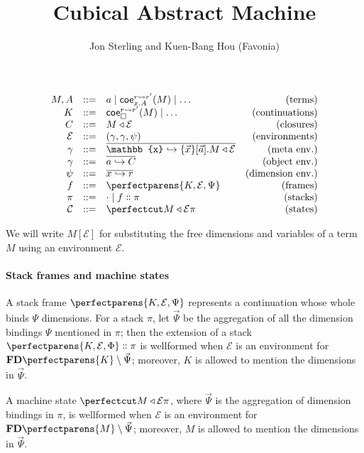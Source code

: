 \documentclass{article}
\title{Cubical Abstract Machine}
\author{Jon Sterling and Kuen-Bang Hou (Favonia)}
\newcommand\Clo[2]{#1\triangleleft{#2}}
\newcommand\Coe[4]{\mathsf{coe}^{#1\leadsto{#2}}_{#3} (#4)}
\newcommand\Cons[2]{{#1}\dblcolon{#2}}
\newcommand\FreeDims[1]{\mathbf{FD}\perfectparens{#1}}
\newcommand\Frame[3]{\perfectparens{#1,#2,#3}}
\newcommand\Cfg[3]{\cut{\Clo{#1}{#2}}{#3}}
\newcommand\Meta[1]{\mathbb{#1}}
\begin{document}
\maketitle

\[
  \begin{array}{rrlr}
    M,A &::= &a\mid \Coe{r}{r'}{x.A}{M}\mid\ldots&\text{(terms)}\\
    K &::= &\Coe{r}{r'}{\Box}{M}\mid\ldots&\text{(continuations)}\\
    C &::= &\Clo{M}{\mathcal{E}}&\text{(closures)}\\
    \mathcal{E} &::= &(\Meta{\gamma},\gamma,\psi)&\text{(environments)}\\
    \Meta{\gamma} &::= &\overline{\Meta{x}\hookrightarrow\{\vec{x}\}[\vec{a}].\Clo{M}{\mathcal{E}}}&\text{(meta env.)}\\
    \gamma &::= &\overline{a\hookrightarrow C}&\text{(object env.)}\\
    \psi &::= &\overline{x\hookrightarrow r}&\text{(dimension env.)}\\
    f &::= &\Frame{K}{\mathcal{E}}{\Psi} &\text{(frames)}\\
    \pi &::= &\cdot \mid \Cons{f}{\pi} &\text{(stacks)}\\
    \mathcal{C} &::= &\Cfg{M}{\mathcal{E}}{\pi} &\text{(states)}
  \end{array}
\]

We will write $M[\mathcal{E}]$ for substituting the free dimensions
and variables of a term $M$ using an environment $\mathcal{E}$.

\paragraph{Stack frames and machine states}

A stack frame $\Frame{K}{\mathcal{E}}{\Psi}$ represents a continuation
whose whole binds $\Psi$ dimensions. For a stack $\pi$, let
$\vec{\Psi}$ be the aggregation of all the dimension bindings $\Psi$
mentioned in $\pi$; then the extension of a stack
$\Cons{\Frame{K}{\mathcal{E}}{\Phi}}{\pi}$ is wellformed when
$\mathcal{E}$ is an environment for $\FreeDims{K}\setminus\vec{\Psi}$;
moreover, $K$ is allowed to mention the dimensions in $\vec{\Psi}$.

A machine state $\Cfg{M}{\mathcal{E}}{\pi}$, where $\vec{\Psi}$ is the
aggregation of dimension bindings in $\pi$, is wellformed when
$\mathcal{E}$ is an environment for $\FreeDims{M}\setminus\vec{\Psi}$;
moreover, $M$ is allowed to mention the dimensions in $\vec{\Psi}$.
\end{document}
